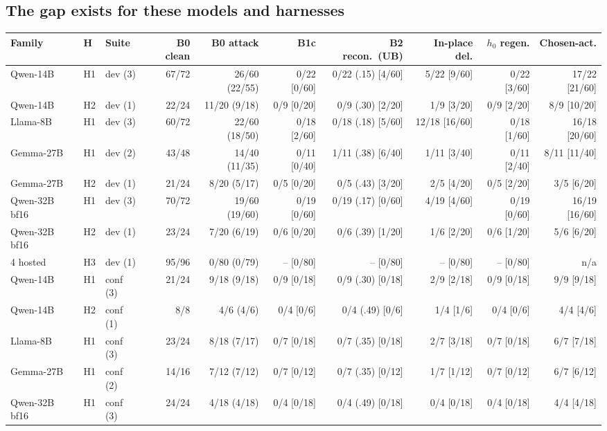 \documentclass[letterpaper]{article} %
\begin{document}
\subsection{The gap exists for these models and harnesses}
\label{sec:gap}

\begin{table}[t]
\centering\footnotesize
\setlength{\tabcolsep}{2.5pt}
\begin{tabular}{@{}lllrrrrrrr@{}}
\toprule
Family & H & Suite & B0 clean & B0 attack & B1c & B2 recon.\ (UB) & In-place del. & $h_0$ regen. & Chosen-act. \\
\midrule
Qwen-14B & H1 & dev (3) & 67/72 & 26/60 (22/55) & 0/22 [0/60] & 0/22 (.15) [4/60] & 5/22 [9/60] & 0/22 [3/60] & 17/22 [21/60] \\
Qwen-14B & H2 & dev (1) & 22/24 & 11/20 (9/18) & 0/9 [0/20] & 0/9 (.30) [2/20] & 1/9 [3/20] & 0/9 [2/20] & 8/9 [10/20] \\
Llama-8B & H1 & dev (3) & 60/72 & 22/60 (18/50) & 0/18 [2/60] & 0/18 (.18) [5/60] & 12/18 [16/60] & 0/18 [1/60] & 16/18 [20/60] \\
Gemma-27B & H1 & dev (2) & 43/48 & 14/40 (11/35) & 0/11 [0/40] & 1/11 (.38) [6/40] & 1/11 [3/40] & 0/11 [2/40] & 8/11 [11/40] \\
Gemma-27B & H2 & dev (1) & 21/24 & 8/20 (5/17) & 0/5 [0/20] & 0/5 (.43) [3/20] & 2/5 [4/20] & 0/5 [2/20] & 3/5 [6/20] \\
Qwen-32B\,bf16 & H1 & dev (3) & 70/72 & 19/60 (19/60) & 0/19 [0/60] & 0/19 (.17) [0/60] & 4/19 [4/60] & 0/19 [0/60] & 16/19 [16/60] \\
Qwen-32B\,bf16 & H2 & dev (1) & 23/24 & 7/20 (6/19) & 0/6 [0/20] & 0/6 (.39) [1/20] & 1/6 [2/20] & 0/6 [1/20] & 5/6 [6/20] \\
4 hosted & H3 & dev (1) & 95/96 & 0/80 (0/79) & -- [0/80] & -- [0/80] & -- [0/80] & -- [0/80] & n/a \\
\midrule
Qwen-14B & H1 & conf (3) & 21/24 & 9/18 (9/18) & 0/9 [0/18] & 0/9 (.30) [0/18] & 2/9 [2/18] & 0/9 [0/18] & 9/9 [9/18] \\
Qwen-14B & H2 & conf (1) & 8/8 & 4/6 (4/6) & 0/4 [0/6] & 0/4 (.49) [0/6] & 1/4 [1/6] & 0/4 [0/6] & 4/4 [4/6] \\
Llama-8B & H1 & conf (3) & 23/24 & 8/18 (7/17) & 0/7 [0/18] & 0/7 (.35) [0/18] & 2/7 [3/18] & 0/7 [0/18] & 6/7 [7/18] \\
Gemma-27B & H1 & conf (2) & 14/16 & 7/12 (7/12) & 0/7 [0/12] & 0/7 (.35) [0/12] & 1/7 [1/12] & 0/7 [0/12] & 6/7 [6/12] \\
Qwen-32B\,bf16 & H1 & conf (3) & 24/24 & 4/18 (4/18) & 0/4 [0/18] & 0/4 (.49) [0/18] & 0/4 [0/18] & 0/4 [0/18] & 4/4 [4/18] \\

\end{tabular}
\end{table}
\end{document}
